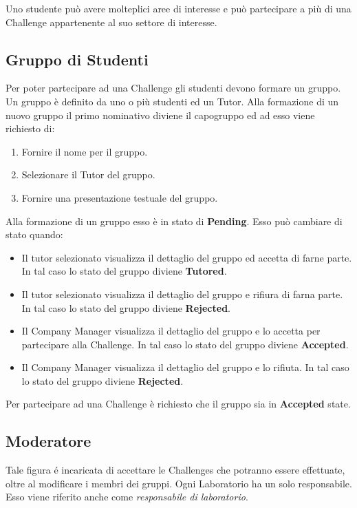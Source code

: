 Uno studente può avere molteplici aree di interesse e può partecipare a più di una Challenge appartenente al suo settore di interesse.

\subsection{Gruppo di Studenti}
Per poter partecipare ad una Challenge gli studenti devono formare un gruppo. Un gruppo è definito da uno o più studenti ed un Tutor. 
Alla formazione di un nuovo gruppo il primo nominativo diviene il capogruppo ed ad esso viene richiesto di:
 \begin{enumerate}
        \item Fornire il nome per il gruppo.
        \item Selezionare il Tutor del gruppo. 
        \item Fornire una presentazione testuale del gruppo. 
\end{enumerate}

Alla formazione di un gruppo esso è in stato di \textbf{Pending}. Esso può cambiare di stato quando:
\begin{itemize}
    \item Il tutor selezionato visualizza il dettaglio del gruppo ed accetta di farne parte. In tal caso lo stato del gruppo diviene \textbf{Tutored}. 
    \item Il tutor selezionato visualizza il dettaglio del gruppo e rifiura di farna parte. In tal caso lo stato del gruppo diviene \textbf{Rejected}. 
    \item Il Company Manager visualizza il dettaglio del gruppo e lo accetta per partecipare alla Challenge. In tal caso lo stato del gruppo diviene \textbf{Accepted}. 
    \item Il Company Manager visualizza il dettaglio del gruppo e lo rifiuta. In tal caso lo stato del gruppo diviene \textbf{Rejected}. 
\end{itemize}

Per partecipare ad una Challenge è richiesto che il gruppo sia in \textbf{Accepted} state.



\subsection{Moderatore}
Tale figura é incaricata di accettare le Challenges che potranno essere effettuate, oltre al modificare i membri dei gruppi. Ogni Laboratorio ha un solo responsabile. Esso viene riferito anche come \textit{responsabile di laboratorio}.

